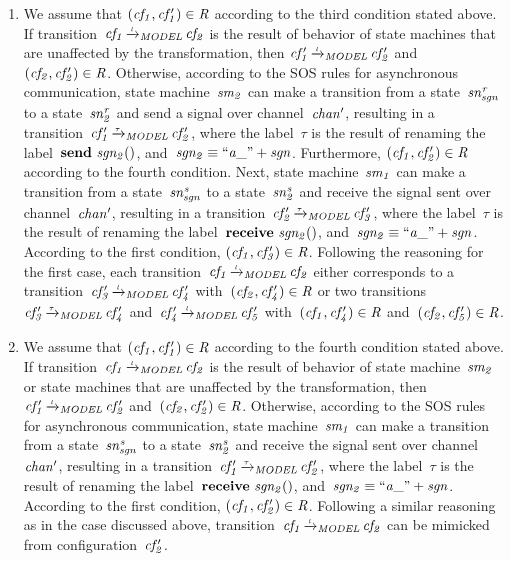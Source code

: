 \begin{enumerate}
\item
We assume that $(\it{cf_1}, \it{cf_1'})\in R$ according to the third condition stated above.
If transition~$\it{cf_1} \TextModelRelation{l} \it{cf_2}$ is the result of behavior of state machines that are unaffected by the transformation, then $\it{cf'_1} \TextModelRelation{l} \it{cf'_2}$ and~$(\it{cf_2}, \it{cf_2'})\in R$.
Otherwise, according to the SOS rules for asynchronous communication,
state machine~$\it{sm_2}$ can make a transition from a state~$\it{sn^r_{sgn}}$ to a state~$\it{sn^r_2}$ and send a signal over channel~$\it{chan'}$, resulting in a transition~$\it{cf'_1} \TextModelRelation{\tau} \it{cf'_2}$,
where the label~$\tau$ is the result of renaming the label~$\textbf{send}\ \it{sgn_2}()$, and~$\it{sgn_2} \equiv ``a\_" + \it{sgn}$.
Furthermore, $(\it{cf_1}, \it{cf_2'})\in R$ according to the fourth condition.
Next, state machine~$\it{sm_1}$ can make a transition from a state~$\it{sn^s_{sgn}}$ to a state~$\it{sn^s_2}$ and receive the signal sent over channel~$\it{chan'}$, resulting in a transition~$\it{cf'_2} \TextModelRelation{\tau} \it{cf'_3}$,
where the label~$\tau$ is the result of renaming the label~$\textbf{receive}\ \it{sgn_2}()$, and~$\it{sgn_2} \equiv ``a\_" + \it{sgn}$.
According to the first condition, $(\it{cf_1}, \it{cf_3'})\in R$.
Following the reasoning for the first case, each transition~$\it{cf_1} \TextModelRelation{l} \it{cf_2}$ either corresponds to a transition~$\it{cf_3'} \TextModelRelation{l} \it{cf_4'}$ with~$(\it{cf_2}, \it{cf_4'})\in R$ or two transitions~$\it{cf_3'} \TextModelRelation{\tau} \it{cf_4'}$ and~$\it{cf_4'} \TextModelRelation{l} \it{cf_5'}$ with~$(\it{cf_1}, \it{cf_4'}) \in R$ and~$(\it{cf_2}, \it{cf_5'}) \in R$.

\item
We assume that $(\it{cf_1}, \it{cf_1'})\in R$ according to the fourth condition stated above.
If transition~$\it{cf_1} \TextModelRelation{l} \it{cf_2}$ is the result of behavior of state machine~$\it{sm_2}$ or state machines that are unaffected by the transformation, then $\it{cf'_1} \TextModelRelation{l} \it{cf'_2}$ and~$(\it{cf_2}, \it{cf_2'})\in R$.
Otherwise, according to the SOS rules for asynchronous communication,
state machine~$\it{sm_1}$ can make a transition from a state~$\it{sn^s_{sgn}}$ to a state~$\it{sn^s_2}$ and receive the signal sent over channel~$\it{chan'}$, resulting in a transition~$\it{cf'_1} \TextModelRelation{\tau} \it{cf'_2}$,
where the label~$\tau$ is the result of renaming the label~$\textbf{receive}\ \it{sgn_2}()$, and~$\it{sgn_2} \equiv ``a\_" + \it{sgn}$.
According to the first condition, $(\it{cf_1}, \it{cf_2'})\in R$.
Following a similar reasoning as in the case discussed above, transition~$\it{cf_1} \TextModelRelation{l} \it{cf_2}$ can be mimicked from configuration~$\it{cf'_2}$.
\end{enumerate}

